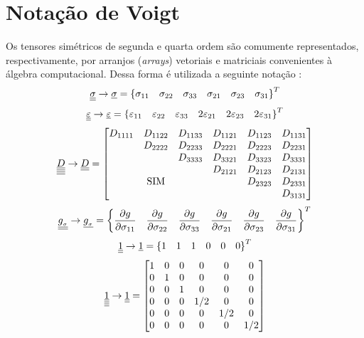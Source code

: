 \section{Notação de Voigt}
Os tensores simétricos de segunda e quarta ordem são comumente representados, respectivamente, por arranjos (\textit{arrays}) vetoriais e matriciais convenientes à álgebra computacional. Dessa forma é utilizada a seguinte notação \cite[p. 682]{Zienkiewicz2005}:
\begin{equation}
	\label{eq:sigmal}
	\underline{\underline \sigma} \rightarrow \underline \sigma = \left\{\sigma_{11}~~~\sigma_{22}~~~\sigma_{33}~~~\sigma_{21}~~~\sigma_{23}~~~\sigma_{31} \right\}^T
\end{equation}
\begin{equation}
	\label{eq:varepsilonl}
	\underline{\underline \varepsilon} \rightarrow \underline{\varepsilon} = \left\{\varepsilon_{11}~~~\varepsilon_{22}~~~\varepsilon_{33}~~~2\varepsilon_{21}~~~2\varepsilon_{23}~~~2\varepsilon_{31} \right\}^T
\end{equation}
\begin{equation}
	\label{eq:Dl}
	\underline{\underline{\underline{\underline D}}} \rightarrow \underline{\underline D} = 
	\begin{bmatrix}
		D_{1111} & D_{1122} & D_{1133}  & D_{1121} & D_{1123} & D_{1131} \\
				& D_{2222}  & D_{2233}  & D_{2221} & D_{2223} & D_{2231}  \\
				& 			& D_{3333}  & D_{3321} & D_{3323} & D_{3331}  \\
				& 			&		    & D_{2121} & D_{2123} & D_{2131}  \\
				& \text{SIM}&		    & 	       & D_{2323} & D_{2331}  \\
				& 			&		    & 	       &          & D_{3131} 
	\end{bmatrix}
\end{equation}
\begin{equation}
	\label{eq:dgdsl}
	\underline{\underline {g_{_\sigma}}} \rightarrow \underline{g_{_\sigma}} = \left\{\dfrac{\partial g}{\partial \sigma_{11}}~~~\dfrac{\partial g}{\partial \sigma_{22}}~~~\dfrac{\partial g}{\partial \sigma_{33}}~~~\dfrac{\partial g}{\partial \sigma_{21}}~~~\dfrac{\partial g}{\partial \sigma_{23}}~~~\dfrac{\partial g}{\partial \sigma_{31}} \right\}^T
\end{equation}
\begin{equation}
	\label{eq:Uml}
	\underline{\underline 1} \rightarrow \underline{1} = \left\{1~~~1~~~1~~~0~~~0~~~0 \right\}^T
\end{equation}
\begin{equation}
	\label{eq:UmllotimesUll}
	\underline{\underline{\underline{\underline 1}}} \rightarrow \underline{\underline 1} = 
	\begin{bmatrix}
		1 & 0 & 0 & 0 & 0 & 0 \\
		0 & 1 & 0 & 0 & 0 & 0  \\
		0 & 0 & 1 & 0 & 0 & 0  \\
		0 & 0 & 0 & 1/2 & 0 & 0  \\
		0 & 0 & 0 & 0 & 1/2 & 0  \\
		0 & 0 & 0 & 0 & 0 & 1/2 
	\end{bmatrix}
\end{equation}

